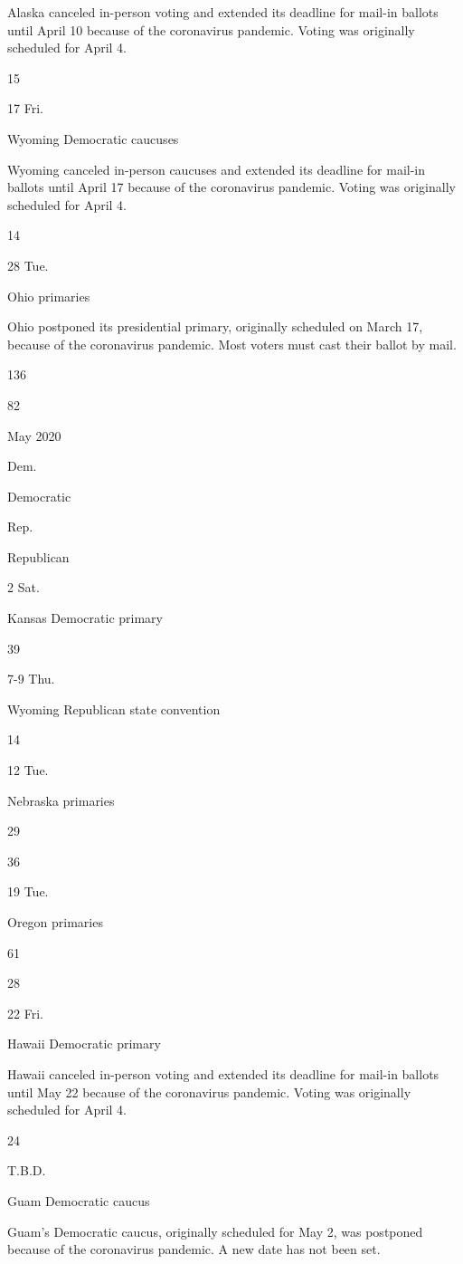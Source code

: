 Alaska canceled in-person voting and extended its deadline for mail-in
ballots until April 10 because of the coronavirus pandemic. Voting was
originally scheduled for April 4.

15

17 Fri.

Wyoming Democratic caucuses

Wyoming canceled in-person caucuses and extended its deadline for
mail-in ballots until April 17 because of the coronavirus pandemic.
Voting was originally scheduled for April 4.

14

28 Tue.

Ohio primaries

Ohio postponed its presidential primary, originally scheduled on March
17, because of the coronavirus pandemic. Most voters must cast their
ballot by mail.

136

82

May 2020

Dem.

Democratic

Rep.

Republican

2 Sat.

Kansas Democratic primary

39

7-9 Thu.

Wyoming Republican state convention

14

12 Tue.

Nebraska primaries

29

36

19 Tue.

Oregon primaries

61

28

22 Fri.

Hawaii Democratic primary

Hawaii canceled in-person voting and extended its deadline for mail-in
ballots until May 22 because of the coronavirus pandemic. Voting was
originally scheduled for April 4.

24

T.B.D.

Guam Democratic caucus

Guam's Democratic caucus, originally scheduled for May 2, was postponed
because of the coronavirus pandemic. A new date has not been set.

